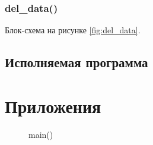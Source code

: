 \documentclass[12pt, a4paper]{article}
\begin{document}
\subsubsection{del\_data()}
Блок-схема на рисунке \ref{fig:del_data}.




\subsection{Исполняемая программа}

\labconclusion{}

\newpage

\section{Приложения}

\begin{figure}[h]
    \caption{main()}
    \label{fig:main}
\end{figure}
\end{document}
